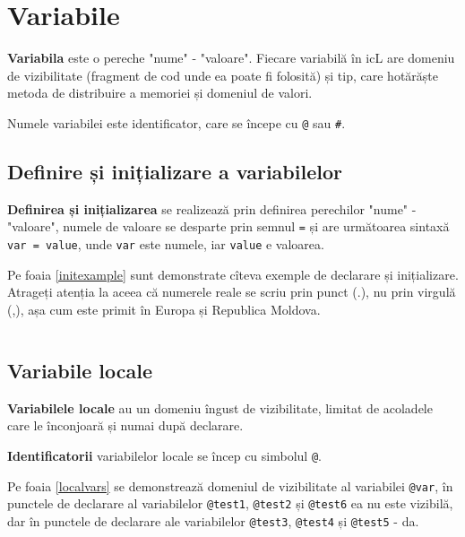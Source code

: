 \section{Variabile}

\textbf{Variabila} este o pereche "nume" - "valoare". Fiecare variabilă în icL are domeniu de vizibilitate (fragment de cod unde ea poate fi folosită) și tip, care hotărăște metoda de distribuire a memoriei și domeniul de valori.

Numele variabilei este identificator, care se începe cu \texttt{@} sau {\color{blue2}\texttt{#}}. 

\subsection{Definire și inițializare a variabilelor}

\textbf{Definirea și inițializarea} se realizează prin definirea perechilor "nume" - "valoare", numele de valoare se desparte prin semnul \texttt{=} și are următoarea sintaxă \texttt{var = value}, unde \texttt{var} este numele, iar \texttt{value} e valoarea.

Pe foaia \ref{initexample} sunt demonstrate cîteva exemple de declarare și inițializare. Atrageți atenția la aceea că numerele reale se scriu prin punct (.), nu prin virgulă (,), așa cum este primit în Europa și Republica Moldova.

\begin{sourcecode}
\label{initexample}
\inputminted[linenos]{icl}{../sources/initexample.icL}
\end{sourcecode}

\subsection{Variabile locale}

\textbf{Variabilele locale} au un domeniu îngust de vizibilitate, limitat de acoladele care le înconjoară și numai după declarare.

{\bf Identificatorii} variabilelor locale se încep cu simbolul \texttt{@}.

Pe foaia \ref{localvars} se demonstrează domeniul de vizibilitate al variabilei \texttt{@var}, în punctele de declarare al variabilelor \texttt{@test1}, \texttt{@test2} și \texttt{@test6} ea nu este vizibilă, dar în punctele de declarare ale variabilelor \texttt{@test3}, \texttt{@test4} și \texttt{@test5} - da.

